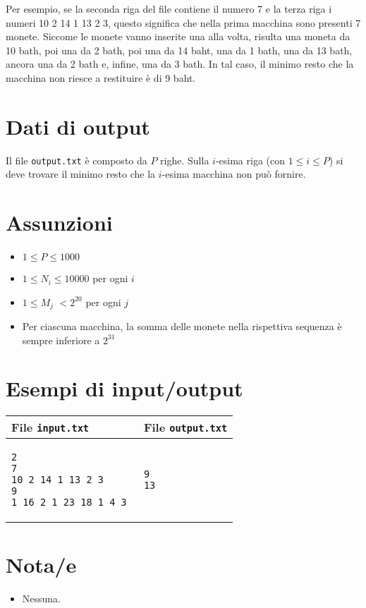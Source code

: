\documentclass[a4paper,11pt]{article}
\begin{document}
Per esempio, se la seconda riga del file contiene il numero 7 e la
terza riga i numeri 10 2 14 1 13 2 3, questo significa che nella prima
macchina sono presenti 7 monete. Siccome le monete vanno inserite una
alla volta, risulta una moneta da 10 bath, poi una da 2 bath, poi una
da 14 baht, una da 1 bath, una da 13 bath, ancora una da 2 bath e,
infine, una da 3 bath. In tal caso, il minimo resto che la macchina
non riesce a restituire è di 9 baht.


\section*{Dati di output}
  
Il file \texttt{output.txt} è composto da $P$ righe.
Sulla $i$-esima riga (con $1 ≤ i ≤ P$) si deve
trovare il minimo resto che la $i$-esima macchina non
può fornire.

  \section*{Assunzioni}
  \begin{itemize}
  
    \item $1 ≤ P ≤ 1000$
    \item $1 ≤ N_{i}$$ ≤ 10 000$ per ogni $i$
    \item $1 ≤ M_{j}$ $< 2^{20}$ per ogni $j$ 
    \item Per ciascuna macchina, la somma delle monete nella rispettiva sequenza è sempre inferiore a $2^{31}$
  \end{itemize}

\section*{Esempi di input/output}

  
    \noindent
    \begin{tabular}{p{11cm}|p{5cm}}
    \toprule
    \textbf{File \texttt{input.txt}}
    & \textbf{File \texttt{output.txt}}
    \\
    \midrule
    \scriptsize
    \begin{verbatim}
2
7
10 2 14 1 13 2 3 
9
1 16 2 1 23 18 1 4 3 
\end{verbatim}
    &
    \scriptsize
    \begin{verbatim}
9
13
\end{verbatim}
    \\
    \bottomrule
    \end{tabular}
  
\section*{Nota/e}
\begin{itemize}
  
    \item 
Nessuna.

\end{itemize}
\end{document}
